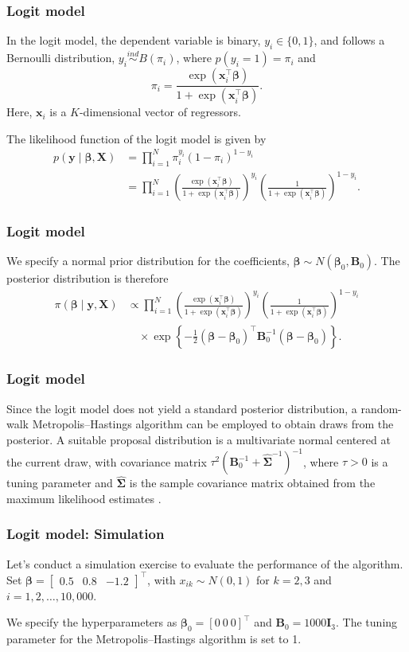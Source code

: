 \documentclass[12pt, compress]{beamer}
\begin{document}
\begin{frame}
	\frametitle{Logit model}
In the logit model, the dependent variable is binary, $y_i \in \{0,1\}$, and follows a Bernoulli distribution, $y_i \stackrel{ind}{\sim} B(\pi_i)$, where $p(y_i = 1) = \pi_i$ and 
\[
\pi_i = \frac{\exp({\bm{x}}_i^{\top}\bm{\beta})}{1 + \exp({\bm{x}}_i^{\top}\bm{\beta})}.
\]
Here, $\bm{x}_i$ is a $K$-dimensional vector of regressors.

The likelihood function of the logit model is given by
\begin{align*}
	p({\bm{y}} \mid \bm{\beta}, {\bm{X}}) 
	&= \prod_{i=1}^N \pi_i^{y_i} (1 - \pi_i)^{1 - y_i} \\
	&= \prod_{i=1}^N 
	\left(\frac{\exp({\bm{x}}_i^{\top}\bm{\beta})}{1 + \exp({\bm{x}}_i^{\top}\bm{\beta})}\right)^{y_i}
	\left(\frac{1}{1 + \exp({\bm{x}}_i^{\top}\bm{\beta})}\right)^{1 - y_i}.
\end{align*}
\end{frame}

\begin{frame}
	\frametitle{Logit model}
We specify a normal prior distribution for the coefficients, $\bm{\beta} \sim N({\bm{\beta}}_0, {\bm{B}}_0)$. The posterior distribution is therefore
\begin{align*}
	\pi(\bm{\beta} \mid {\bm{y}}, {\bm{X}}) &\propto 
	\prod_{i=1}^N 
	\left(\frac{\exp({\bm{x}}_i^{\top}\bm{\beta})}{1 + \exp({\bm{x}}_i^{\top}\bm{\beta})}\right)^{y_i}
	\left(\frac{1}{1 + \exp({\bm{x}}_i^{\top}\bm{\beta})}\right)^{1 - y_i} \\
	&\quad \times 
	\exp\left\{ -\frac{1}{2} (\bm{\beta} - \bm{\beta}_0)^{\top} 
	{\bm{B}}_0^{-1} (\bm{\beta} - \bm{\beta}_0) \right\}.
\end{align*}
\end{frame}

\begin{frame}
	\frametitle{Logit model}
Since the logit model does not yield a standard posterior distribution, a random-walk Metropolis–Hastings algorithm can be employed to obtain draws from the posterior. A suitable proposal distribution is a multivariate normal centered at the current draw, with covariance matrix 
$\tau^2({\bm{B}}_0^{-1} + \widehat{{\bm{\Sigma}}}^{-1})^{-1}$, 
where $\tau > 0$ is a tuning parameter and $\widehat{\bm{\Sigma}}$ is the sample covariance matrix obtained from the maximum likelihood estimates \citep{Martin2011}.
\end{frame}

\begin{frame}
	\frametitle{Logit model: Simulation}
Let's conduct a simulation exercise to evaluate the performance of the algorithm. Set $\bm{\beta} = \begin{bmatrix} 0.5 & 0.8 & -1.2 \end{bmatrix}^{\top}$, with $x_{ik} \sim N(0,1)$ for $k = 2, 3$ and $i = 1, 2, \dots, 10{,}000$.

We specify the hyperparameters as $\bm{\beta}_0 = [0 \ 0 \ 0]^{\top}$ and ${\bm{B}}_0 = 1000{\bm{I}}_3$. The tuning parameter for the Metropolis–Hastings algorithm is set to 1.
\end{frame}
\end{document}
